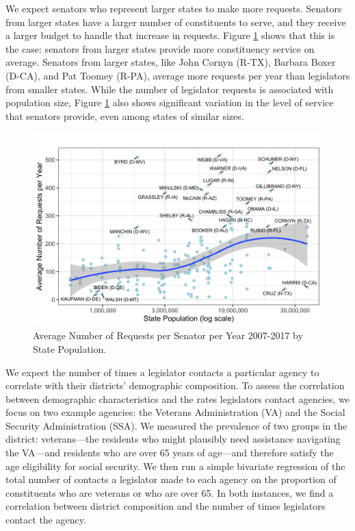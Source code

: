 \documentclass[12pt]{article}
\begin{document}
We expect senators who represent larger states to make more requests. Senators from larger states have a larger number of constituents to serve, and they receive a larger budget to handle that increase in requests.
Figure \ref{f:stateSize} shows that this is the case: senators from larger states provide more constituency service on average. Senators from larger states, like John Cornyn (R-TX), Barbara Boxer (D-CA), and Pat Toomey (R-PA), average more requests per year than legislators from smaller states. While the number of legislator requests is associated with population size, Figure \ref{f:stateSize} also shows significant variation in the level of service that senators provide, even among states of similar sizes.  

\begin{figure}
\centering
\caption{Average Number of Requests per Senator per Year 2007-2017 by State Population.} \label{f:stateSize}
\includegraphics[width = \textwidth]{figs/pop-1}
\end{figure}

We expect the number of times a legislator contacts a particular agency to correlate with their districts' demographic composition. To assess the correlation between demographic characteristics and the rates legislators contact agencies, we focus on two example agencies: the Veterans Administration (VA) and the Social Security Administration (SSA). We measured the prevalence of two groups in the district: veterans---the residents who might plausibly need assistance navigating the VA---and residents who are over 65 years of age---and therefore satisfy the age eligibility for social security. We then run a simple bivariate regression of the total number of contacts a legislator made to each agency on the proportion of constituents who are veterans or who are over 65.  
In both instances, we find a correlation between district composition and the number of times legislators contact the agency. 
\end{document}
